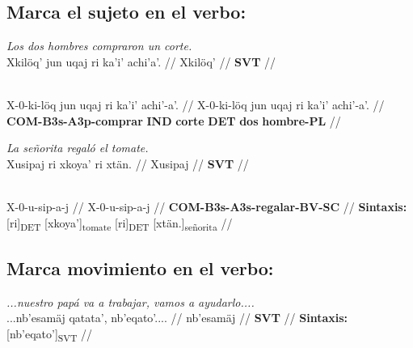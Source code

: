 \documentclass{article}%
\begin{document}
\subsection{Marca el sujeto en el verbo:}%
\label{subsec:Marcaelsujetoenelverbo}%

%
\par\medskip%
\ex
\textit{Los dos hombres compraron un corte.} \\
\begingl
\gla Xkilöq' jun uqaj ri ka'i' achi'a'. //
\glb Xkilöq' //
\glc \textbf{SVT} //
\endgl
\xe
%
\medskip%
\par\medskip%
\ex
\textit{} \\
\begingl
\gla X-0-ki-löq jun uqaj ri ka'i' achi'-a'. //
\glb X-0-ki-löq jun uqaj ri ka'i' achi'-a'. //
\glc \textbf{COM-}\textbf{B3s-}\textbf{A3p-}\textbf{comprar} \textbf{IND} \textbf{corte} \textbf{DET} \textbf{dos} \textbf{hombre-PL} //
\endgl
\xe
%
\medskip%
\par\medskip%
\ex
\textit{La señorita regaló el tomate.} \\
\begingl
\gla Xusipaj ri xkoya' ri xtän. //
\glb Xusipaj //
\glc \textbf{SVT} //
\endgl
\xe
%
\medskip%
\par\medskip%
\ex
\textit{} \\
\begingl
\gla X-0-u-sip-a-j //
\glb X-0-u-sip-a-j //
\glc \textbf{COM-}\textbf{B3s-}\textbf{A3s-}\textbf{regalar-}\textbf{BV-}\textbf{SC} //
\glft \textbf{Sintaxis:} [ri]\textsubscript{DET} [xkoya']\textsubscript{tomate} [ri]\textsubscript{DET} [xtän.]\textsubscript{señorita} //
\endgl
\xe
%
\medskip%
\subsection{Marca movimiento en el verbo:}%
\label{subsec:Marcamovimientoenelverbo}%

%
\par\medskip%
\ex
\textit{...nuestro papá va a trabajar, vamos a ayudarlo....} \\
\begingl
\gla ...nb'esamäj qatata', nb'eqato'.... //
\glb nb'esamäj //
\glc \textbf{SVT} //
\glft \textbf{Sintaxis:} [nb'eqato']\textsubscript{SVT} //
\endgl
\xe
%
\medskip

%
\end{document}
